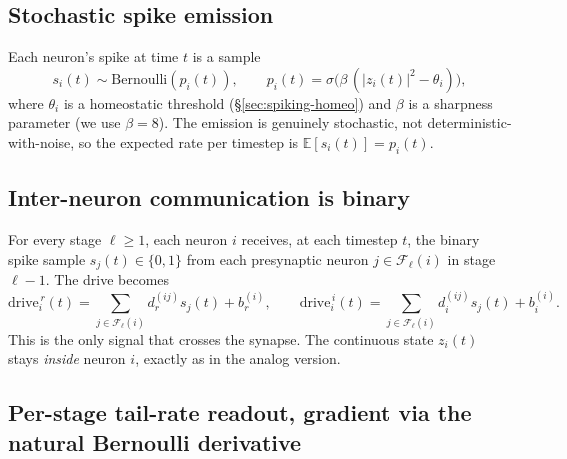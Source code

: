\documentclass[11pt]{article}
\begin{document}
\subsection{Stochastic spike emission}

Each neuron's spike at time $t$ is a sample
\begin{equation}
s_i(t) \sim \text{Bernoulli}(p_i(t)),
\qquad
p_i(t) = \sigma\!\big(\beta\,(|z_i(t)|^2 - \theta_i)\big),
\label{eq:spike}
\end{equation}
where $\theta_i$ is a homeostatic threshold (\S\ref{sec:spiking-homeo}) and $\beta$ is a sharpness parameter (we use $\beta=8$). The
emission is genuinely stochastic, not deterministic-with-noise, so the
expected rate per timestep is $\mathbb{E}[s_i(t)] = p_i(t)$.

\subsection{Inter-neuron communication is binary}

For every stage $\ell \ge 1$, each neuron $i$ receives, at each
timestep $t$, the binary spike sample $s_j(t) \in \{0,1\}$ from
each presynaptic neuron $j \in \mathcal F_\ell(i)$ in stage $\ell-1$.
The drive becomes
\begin{equation}
\text{drive}_i^{\,r}(t) = \!\!\!\sum_{j \in \mathcal F_\ell(i)} \!\!\!d_r^{(ij)} s_j(t) + b_r^{(i)},
\qquad
\text{drive}_i^{\,i}(t) = \!\!\!\sum_{j \in \mathcal F_\ell(i)} \!\!\!d_i^{(ij)} s_j(t) + b_i^{(i)}.
\end{equation}
This is the only signal that crosses the synapse. The continuous
state $z_i(t)$ stays \emph{inside} neuron $i$, exactly as in the
analog version.

\subsection{Per-stage tail-rate readout, gradient via the natural Bernoulli derivative}
\end{document}
